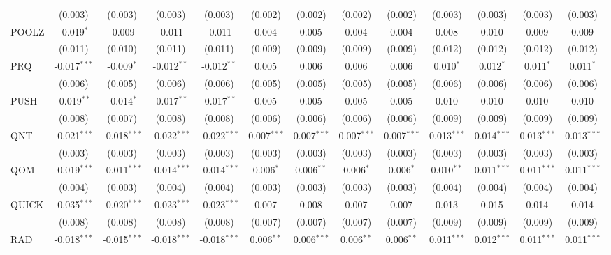 \begin{table}[!htbp]
\begin{tabular}{@{\extracolsep{5pt}}lcccccccccccc}
  & (0.003) & (0.003) & (0.003) & (0.003) & (0.002) & (0.002) & (0.002) & (0.002) & (0.003) & (0.003) & (0.003) & (0.003) \\
 POOLZ & -0.019$^{*}$ & -0.009$^{}$ & -0.011$^{}$ & -0.011$^{}$ & 0.004$^{}$ & 0.005$^{}$ & 0.004$^{}$ & 0.004$^{}$ & 0.008$^{}$ & 0.010$^{}$ & 0.009$^{}$ & 0.009$^{}$ \\
  & (0.011) & (0.010) & (0.011) & (0.011) & (0.009) & (0.009) & (0.009) & (0.009) & (0.012) & (0.012) & (0.012) & (0.012) \\
 PRQ & -0.017$^{***}$ & -0.009$^{*}$ & -0.012$^{**}$ & -0.012$^{**}$ & 0.005$^{}$ & 0.006$^{}$ & 0.006$^{}$ & 0.006$^{}$ & 0.010$^{*}$ & 0.012$^{*}$ & 0.011$^{*}$ & 0.011$^{*}$ \\
  & (0.006) & (0.005) & (0.006) & (0.006) & (0.005) & (0.005) & (0.005) & (0.005) & (0.006) & (0.006) & (0.006) & (0.006) \\
 PUSH & -0.019$^{**}$ & -0.014$^{*}$ & -0.017$^{**}$ & -0.017$^{**}$ & 0.005$^{}$ & 0.005$^{}$ & 0.005$^{}$ & 0.005$^{}$ & 0.010$^{}$ & 0.010$^{}$ & 0.010$^{}$ & 0.010$^{}$ \\
  & (0.008) & (0.007) & (0.008) & (0.008) & (0.006) & (0.006) & (0.006) & (0.006) & (0.009) & (0.009) & (0.009) & (0.009) \\
 QNT & -0.021$^{***}$ & -0.018$^{***}$ & -0.022$^{***}$ & -0.022$^{***}$ & 0.007$^{***}$ & 0.007$^{***}$ & 0.007$^{***}$ & 0.007$^{***}$ & 0.013$^{***}$ & 0.014$^{***}$ & 0.013$^{***}$ & 0.013$^{***}$ \\
  & (0.003) & (0.003) & (0.003) & (0.003) & (0.003) & (0.003) & (0.003) & (0.003) & (0.003) & (0.003) & (0.003) & (0.003) \\
 QOM & -0.019$^{***}$ & -0.011$^{***}$ & -0.014$^{***}$ & -0.014$^{***}$ & 0.006$^{*}$ & 0.006$^{**}$ & 0.006$^{*}$ & 0.006$^{*}$ & 0.010$^{**}$ & 0.011$^{***}$ & 0.011$^{***}$ & 0.011$^{***}$ \\
  & (0.004) & (0.003) & (0.004) & (0.004) & (0.003) & (0.003) & (0.003) & (0.003) & (0.004) & (0.004) & (0.004) & (0.004) \\
 QUICK & -0.035$^{***}$ & -0.020$^{***}$ & -0.023$^{***}$ & -0.023$^{***}$ & 0.007$^{}$ & 0.008$^{}$ & 0.007$^{}$ & 0.007$^{}$ & 0.013$^{}$ & 0.015$^{}$ & 0.014$^{}$ & 0.014$^{}$ \\
  & (0.008) & (0.008) & (0.008) & (0.008) & (0.007) & (0.007) & (0.007) & (0.007) & (0.009) & (0.009) & (0.009) & (0.009) \\
 RAD & -0.018$^{***}$ & -0.015$^{***}$ & -0.018$^{***}$ & -0.018$^{***}$ & 0.006$^{**}$ & 0.006$^{***}$ & 0.006$^{**}$ & 0.006$^{**}$ & 0.011$^{***}$ & 0.012$^{***}$ & 0.011$^{***}$ & 0.011$^{***}$ \\

\end{tabular}
\end{table}
